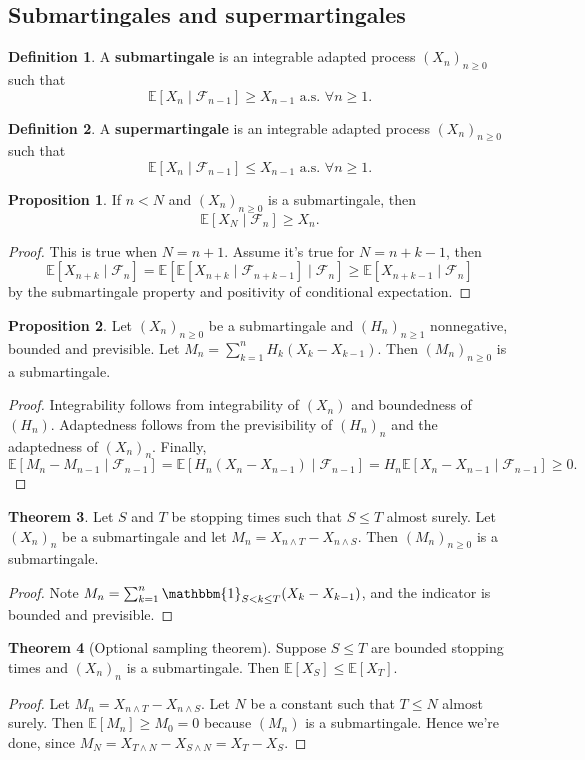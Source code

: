 \documentclass{article}
\theoremstyle{definition}
\newtheorem{theorem}{Theorem}[section]
\newtheorem{prop}[theorem]{Proposition}
\newtheorem{defn}{Definition}[section]
\begin{document}
\subsection{Submartingales and supermartingales}
\begin{defn}
    A \textbf{submartingale} is an integrable adapted process $(X_n)_{n\ge 0}$ such that \[
    \mathbb{E}[X_n \mid \mathcal{F}_{n-1}] \ge X_{n-1} \text{ a.s. }\forall n\ge 1.
    \]
\end{defn}
\begin{defn}
    A \textbf{supermartingale} is an integrable adapted process $(X_n)_{n\ge 0}$ such that \[
        \mathbb{E}[X_n \mid \mathcal{F}_{n-1}] \le X_{n-1} \text{ a.s. }\forall n\ge 1.
    \]
\end{defn}
\begin{prop}
    If $n<N$ and $(X_n)_{n\ge 0}$ is a submartingale, then $$\mathbb{E}[X_N \mid \mathcal{F}_n] \ge X_n.$$
\end{prop}
\begin{proof}
    This is true when $N=n+1$. Assume it's true for $N=n+k-1$, then \[
    \mathbb{E}[X_{n+k} \mid \mathcal{F}_n] = \mathbb{E}[\mathbb{E}[X_{n+k} \mid \mathcal{F}_{n+k-1}] \mid \mathcal{F}_n] \ge \mathbb{E}[X_{n+k-1} \mid \mathcal{F}_n]
    \]
    by the submartingale property and positivity of conditional expectation.
\end{proof}
\begin{prop}
    Let $(X_n)_{n\ge 0}$ be a submartingale and $(H_n)_{n\ge 1}$ nonnegative, bounded and previsible. Let $M_n = \sum_{k=1}^{n} H_k(X_k-X_{k-1})$.
    Then $(M_n)_{n\ge 0}$ is a submartingale.
\end{prop}
\begin{proof}
    Integrability follows from integrability of $(X_n)$ and boundedness of $(H_n)$. Adaptedness follows from the previsibility of $(H_n)_n$ and the adaptedness of $(X_n)_n$. Finally, \[
    \mathbb{E}[M_n-M_{n-1} \mid \mathcal{F}_{n-1}] = \mathbb{E}[H_n(X_n-X_{n-1}) \mid \mathcal{F}_{n-1}] = H_n \mathbb{E}[X_n-X_{n-1} \mid \mathcal{F}_{n-1}] \ge 0.
    \]
\end{proof}
\begin{theorem}
    Let $S$ and $T$ be stopping times such that $S\le T$ almost surely. Let $(X_n)_n$ be a submartingale and let $M_n = X_{n \wedge T} - X_{n \wedge S}$. Then $(M_n)_{n\ge 0}$ is a submartingale. 
\end{theorem}
\begin{proof}
    Note $M_n = \sum_{k=1}^{n} \mathbbm{1}_{S<k\le T}(X_k-X_{k-1})$, and the indicator is bounded and previsible.
\end{proof}
\begin{theorem}[Optional sampling theorem]
    Suppose $S \le T$ are bounded stopping times and $(X_n)_{n}$ is a submartingale. Then $\mathbb{E}[X_S]\le \mathbb{E}[X_T]$.
\end{theorem}
\begin{proof}
    Let $M_n = X_{n \wedge T} - X_{n \wedge S}$. Let $N$ be a constant such that $T\le N$ almost surely. Then $\mathbb{E}[M_n]\ge M_0=0$ because $(M_n)$ is a submartingale. Hence we're done, since $M_N = X_{T \wedge N} - X_{S \wedge N} = X_T-X_S$.
\end{proof}
\end{document}
